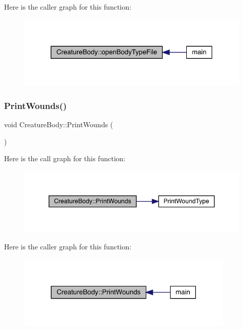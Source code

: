 Here is the caller graph for this function\+:
\nopagebreak
\begin{figure}[H]
\begin{center}
\leavevmode
\includegraphics[width=320pt]{da/d7d/class_creature_body_ac4140e081c8970ad4330c253c615ba33_icgraph}
\end{center}
\end{figure}
\mbox{\label{class_creature_body_a82e519351551538b1138fea170776f3f}} 
\subsubsection{\texorpdfstring{Print\+Wounds()}{PrintWounds()}}
{\footnotesize\ttfamily void Creature\+Body\+::\+Print\+Wounds (\begin{DoxyParamCaption}{ }\end{DoxyParamCaption})}

Here is the call graph for this function\+:
\nopagebreak
\begin{figure}[H]
\begin{center}
\leavevmode
\includegraphics[width=346pt]{da/d7d/class_creature_body_a82e519351551538b1138fea170776f3f_cgraph}
\end{center}
\end{figure}
Here is the caller graph for this function\+:
\nopagebreak
\begin{figure}[H]
\begin{center}
\leavevmode
\includegraphics[width=294pt]{da/d7d/class_creature_body_a82e519351551538b1138fea170776f3f_icgraph}
\end{center}
\end{figure}
\mbox{\label{class_creature_body_a52d765dd974e81a549fd0cb27b355cf2}} 
